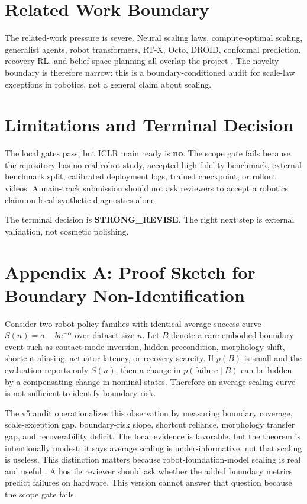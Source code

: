 \documentclass{article}
\begin{document}
\section{Related Work Boundary}
The related-work pressure is severe. Neural scaling laws, compute-optimal scaling, generalist agents, robot transformers, RT-X, Octo, DROID, conformal prediction, recovery RL, and belief-space planning all overlap the project \citep{wang2026qwenvla2,pacaud2025scaling3,ma2026research4,pirbastindsegmentation5,lu2026omnieegbench6,chowdhury2025lagea7}. The novelty boundary is therefore narrow: this is a boundary-conditioned audit for scale-law exceptions in robotics, not a general claim about scaling.

\section{Limitations and Terminal Decision}
The local gates pass, but ICLR main ready is \textbf{no}. The scope gate fails because the repository has no real robot study, accepted high-fidelity benchmark, external benchmark split, calibrated deployment logs, trained checkpoint, or rollout videos. A main-track submission should not ask reviewers to accept a robotics claim on local synthetic diagnostics alone.

The terminal decision is \textbf{STRONG\_REVISE}. The right next step is external validation, not cosmetic polishing.

\clearpage

\section{Appendix A: Proof Sketch for Boundary Non-Identification}
Consider two robot-policy families with identical average success curve $S(n)=a-bn^{-\alpha}$ over dataset size $n$. Let $B$ denote a rare embodied boundary event such as contact-mode inversion, hidden precondition, morphology shift, shortcut aliasing, actuator latency, or recovery scarcity. If $p(B)$ is small and the evaluation reports only $S(n)$, then a change in $p(\mathrm{failure}\mid B)$ can be hidden by a compensating change in nominal states. Therefore an average scaling curve is not sufficient to identify boundary risk.

The v5 audit operationalizes this observation by measuring boundary coverage, scale-exception gap, boundary-risk slope, shortcut reliance, morphology transfer gap, and recoverability deficit. The local evidence is favorable, but the theorem is intentionally modest: it says average scaling is under-informative, not that scaling is useless. This distinction matters because robot-foundation-model scaling is real and useful \citep{brohan2023rt2,openx2023rtx,octo2024,khazatsky2024droid,lynch2023interactive}. A hostile reviewer should ask whether the added boundary metrics predict failures on hardware. This version cannot answer that question because the scope gate fails.
\end{document}
